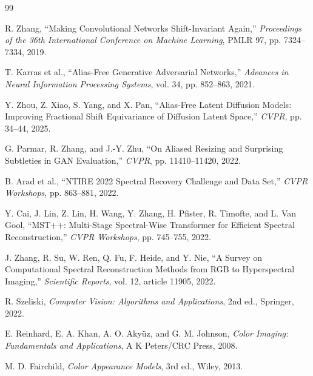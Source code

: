 \documentclass[12pt,openany,oneside]{book}
\begin{document}
\begin{thebibliography}{99}
\begin{LTR}
R. Zhang,
``Making Convolutional Networks Shift-Invariant Again,''
\emph{Proceedings of the 36th International Conference on Machine Learning},
PMLR 97, pp. 7324--7334, 2019.

T. Karras et al.,
``Alias-Free Generative Adversarial Networks,''
\emph{Advances in Neural Information Processing Systems}, vol. 34, pp. 852--863, 2021.

Y. Zhou, Z. Xiao, S. Yang, and X. Pan,
``Alias-Free Latent Diffusion Models: Improving Fractional Shift Equivariance of Diffusion Latent Space,''
\emph{CVPR}, pp. 34--44, 2025.

G. Parmar, R. Zhang, and J.-Y. Zhu,
``On Aliased Resizing and Surprising Subtleties in GAN Evaluation,''
\emph{CVPR}, pp. 11410--11420, 2022.

B. Arad et al.,
``NTIRE 2022 Spectral Recovery Challenge and Data Set,''
\emph{CVPR Workshops}, pp. 863--881, 2022.

Y. Cai, J. Lin, Z. Lin, H. Wang, Y. Zhang, H. Pfister, R. Timofte, and L. Van Gool,
``MST++: Multi-Stage Spectral-Wise Transformer for Efficient Spectral Reconstruction,''
\emph{CVPR Workshops}, pp. 745--755, 2022.

J. Zhang, R. Su, W. Ren, Q. Fu, F. Heide, and Y. Nie,
``A Survey on Computational Spectral Reconstruction Methods from RGB to Hyperspectral Imaging,''
\emph{Scientific Reports}, vol. 12, article 11905, 2022.

R. Szeliski,
\emph{Computer Vision: Algorithms and Applications}, 2nd ed., Springer, 2022.

E. Reinhard, E. A. Khan, A. O. Akyüz, and G. M. Johnson,
\emph{Color Imaging: Fundamentals and Applications}, A K Peters/CRC Press, 2008.

M. D. Fairchild,
\emph{Color Appearance Models}, 3rd ed., Wiley, 2013.

\end{LTR}
\end{thebibliography}
\end{document}
